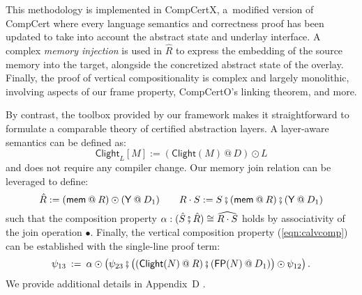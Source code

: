 \documentclass[acmsmall,nonacm]{acmart}
\newcommand{\kw}[1]{\ensuremath{ \mathsf{#1} }}
\newcommand{\jr}{\mathsf{Y}}
\newcommand{\vcomp}{\fatsemi}
\begin{document}
This methodology is implemented in CompCertX,
a~modified version of CompCert where
every language semantics and correctness proof
has been updated
to take into account the abstract state and underlay interface.
A complex \emph{memory injection} is used in $\hat{R}$
to express the embedding of the source memory into the target,
alongside the concretized abstract state of the overlay.
Finally, the proof of vertical compositionality
is complex and largely monolithic,
involving aspects of
our frame property,
CompCertO's linking theorem, and more.

By contrast,
the toolbox provided by our framework
makes it straightforward to formulate a comparable theory
of certified abstraction layers.
A layer-aware semantics can be defined as:
\[
  \kw{Clight}_L[M] := (\kw{Clight}(M) \mathbin@ D) \odot L
\]
and does not require any compiler change.
Our memory join relation can be leveraged to define:
\[
  \hat{R} := 
    (\kw{mem} \mathbin@ R) \odot (\jr \mathbin@ D_1)
  \qquad
  R \cdot S :=
    S \vcomp (\kw{mem} \mathbin@ R) \vcomp (\jr \mathbin@ D_1)
\]
such that the composition property
$\alpha : (\hat{S} \vcomp \hat{R}) \cong \widehat{R \cdot S}$
holds by associativity of the join operation $\bullet$.
Finally,
the vertical composition property (\ref{eqn:calvcomp})
can be established with the single-line proof term:
\[
  \psi_{13} \: := \:
    \alpha \odot \big(
    \psi_{23} \vcomp
    \big( (\kw{Clight}(N) \mathbin@ R) \vcomp
          (\kw{FP}(N) \mathbin@ D_1) \big) \odot \psi_{12} \big)
  \,.
\]
We provide additional details in Appendix~D \citep{compcertoe-tr}. %
\end{document}
